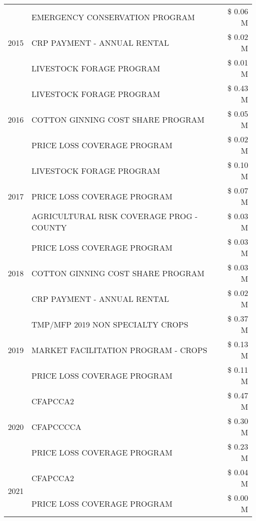 \begin{tabular}{llr}
\multirow[t]{3}{*}{2015} & EMERGENCY CONSERVATION PROGRAM & \$ 0.06 M \\
 & CRP PAYMENT - ANNUAL RENTAL & \$ 0.02 M \\
 & LIVESTOCK FORAGE PROGRAM & \$ 0.01 M \\
\cline{1-3}
\multirow[t]{3}{*}{2016} & LIVESTOCK FORAGE PROGRAM                      & \$ 0.43 M \\
 & COTTON GINNING COST SHARE PROGRAM             & \$ 0.05 M \\
 & PRICE LOSS COVERAGE PROGRAM                   & \$ 0.02 M \\
\cline{1-3}
\multirow[t]{3}{*}{2017} & LIVESTOCK FORAGE PROGRAM & \$ 0.10 M \\
 & PRICE LOSS COVERAGE PROGRAM & \$ 0.07 M \\
 & AGRICULTURAL RISK COVERAGE PROG - COUNTY & \$ 0.03 M \\
\cline{1-3}
\multirow[t]{3}{*}{2018} & PRICE LOSS COVERAGE PROGRAM & \$ 0.03 M \\
 & COTTON GINNING COST SHARE PROGRAM & \$ 0.03 M \\
 & CRP PAYMENT - ANNUAL RENTAL & \$ 0.02 M \\
\cline{1-3}
\multirow[t]{3}{*}{2019} & TMP/MFP 2019 NON SPECIALTY CROPS & \$ 0.37 M \\
 & MARKET FACILITATION PROGRAM - CROPS & \$ 0.13 M \\
 & PRICE LOSS COVERAGE PROGRAM & \$ 0.11 M \\
\cline{1-3}
\multirow[t]{3}{*}{2020} & CFAPCCA2 & \$ 0.47 M \\
 & CFAPCCCCA & \$ 0.30 M \\
 & PRICE LOSS COVERAGE PROGRAM & \$ 0.23 M \\
\cline{1-3}
\multirow[t]{2}{*}{2021} & CFAPCCA2 & \$ 0.04 M \\
 & PRICE LOSS COVERAGE PROGRAM & \$ 0.00 M \\
\cline{1-3}
\bottomrule
\end{tabular}

